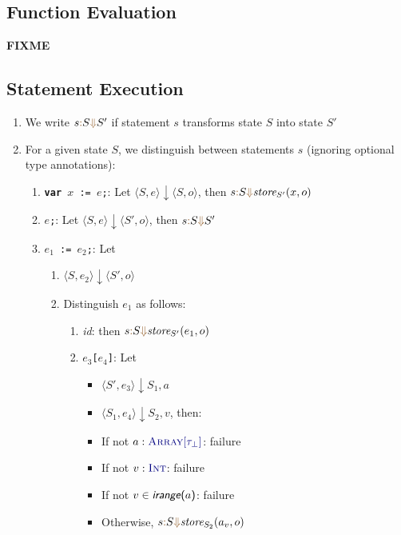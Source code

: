 \documentclass{article}
\newcommand{\tuple}[1]{\ensuremath{\langle #1 \rangle}}
\newcommand{\vterminal}[1]{\textsf{\textcolor{dgreen}{\texttt{#1}}}}
\newcommand{\Ty}[1]{\textcolor{dblue}{#1}}
\newcommand{\Ckw}[1]{{\textsf{\textbf{#1}}}}
\newcommand{\TInt}{\Ty{\textsc{Int}}}
\newcommand{\TArrayof}[1]{\Ty{\textsc{Array}[#1]}}
\newcommand{\arrayindices}[1]{\textsf{\textit{irange}(#1)}}
\newcommand{\failure}{\textcolor{dred}{failure}}
\newcommand{\SEVAL}[3]{#1\textcolor{dorange}{:} #2\textcolor{dorange}{\Downarrow}#3}
\begin{document}
\subsection{Function Evaluation}
\textbf{FIXME}

\subsection{Statement Execution}
\begin{enumerate}
\item We write $\SEVAL{s}{S}{S'}$ if statement $s$ transforms state $S$ into state $S'$
\item For a given state $S$, we distinguish between statements $s$ (ignoring optional type annotations):
  \begin{enumerate}
    \item \vterminal{\Ckw{var} $x$ := $e$;}: Let $\tuple{S, e} \downarrow \tuple{S, o}$, then $\SEVAL{s}{S}{\textit{store}_{S'}(x, o)}$
    \item \vterminal{$e$;}: Let $\tuple{S, e} \downarrow \tuple{S', o}$, then $\SEVAL{s}{S}{S'}$
    \item \vterminal{$e_1$ := $e_2$;}: Let
      \begin{enumerate}
      \item $\tuple{S, e_2} \downarrow \tuple{S', o}$
      \item Distinguish $e_1$ as follows:
        \begin{enumerate}
          \item \textit{id}: then $\SEVAL{s}{S}{\textit{store}_{S'}(e_1, o)}$
          \item \vterminal{$e_3$[$e_4$]}: Let
            \begin{itemize}
            \item $\tuple{S', e_3} \downarrow {S_1, a}$
            \item $\tuple{S_1, e_4} \downarrow {S_2, v}$, then:
            \item If not $a : \TArrayof{\tau_\bot}$: \failure
            \item If not $v : \TInt$: \failure
            \item If not $v \in \arrayindices{$a$}$: \failure
            \item Otherwise, $\SEVAL{s}{S}{\textit{store}_{S_2}(a_v, o)}$
            \end{itemize}
        \end{enumerate}
      \end{enumerate}

\end{enumerate}
\end{enumerate}
\end{document}
